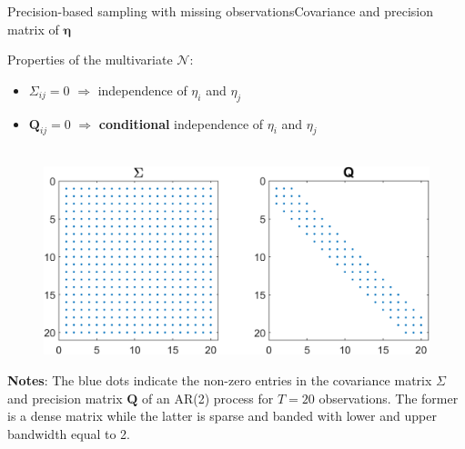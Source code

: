 \documentclass[xcolor=svgnames, 10pt, aspectratio=169]{beamer}
\begin{document}
\begin{frame}{Precision-based sampling with missing observations}{Covariance and precision matrix of $\boldsymbol{\eta}$}

    Properties of the multivariate $\mathcal{N}$: 

    \begin{itemize}
        \item $\Sigma_{ij} = 0$ $\Longrightarrow$ independence of $\eta_i$ and $\eta_j$
        \item $\mathbf{Q}_{ij} = 0$ $\Longrightarrow$ \textbf{conditional} independence of $\eta_i$ and $\eta_j$ \\~\\
    \end{itemize}    

    \begin{adjustbox}{minipage=0.7\textwidth,center}
        \begin{figure}
            \includegraphics[scale = 0.65]{fig_Sigma_Q.png}  \vspace{0.1cm} \\
        \end{figure}
            {\tiny \textbf{Notes}: The blue dots indicate the non-zero entries in the covariance matrix $\Sigma$ and precision matrix $\mathbf{Q}$ of an AR(2) process for $T=20$ observations. The former is a dense matrix while the latter is sparse and banded with lower and upper bandwidth equal to 2.}\par
    \end{adjustbox}
\end{frame}
\end{document}

